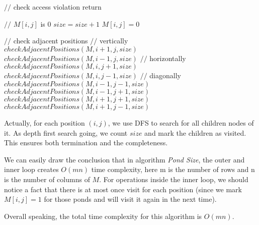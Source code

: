 \begin{algorithm}[]
  \caption{$checkAdjacentPositions$}
  $//$ check access violation\;
  {
    return \;
  }
  
  $//$ $M[i,j]$ is $0$\;
  $size = size+1$ \;
  $M[i,j]=0$\;
  
  $//$ check adjacent positions\;
  $//$ vertically\;
  $checkAdjacentPositions(M, i+1, j, size)$ \;
  $checkAdjacentPositions(M, i-1, j, size)$ \;
  $//$ horizontally\;
  $checkAdjacentPositions(M, i, j+1, size)$ \;
  $checkAdjacentPositions(M, i, j-1, size)$ \;
  $//$ diagonally\;
  $checkAdjacentPositions(M, i-1, j-1, size)$ \;
  $checkAdjacentPositions(M, i-1, j+1, size)$ \;
  $checkAdjacentPositions(M, i+1, j+1, size)$ \;
  $checkAdjacentPositions(M, i+1, j-1, size)$ \;

\end{algorithm}


Actually, for each position $(i, j)$, we use DFS to search for all children nodes of it. As depth first search going, we count $size$ and mark the children as visited. This ensures both termination and the completeness.


We can easily draw the conclusion that in algorithm \textit{Pond Size}, the outer and inner loop creates $O(mn)$ time complexity, here m is the number of rows and n is the number of columns of $M$. For operations inside the inner loop, we should notice a fact that there is at most once visit for each position (since we mark $M[i, j]=1$ for those ponds and will visit it again in the next time).

Overall speaking, the total time complexity for this algorithm is $O(mn)$.

